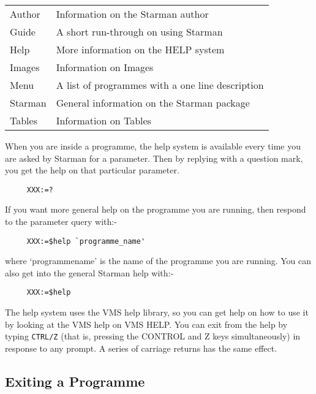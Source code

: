 \begin{tabular}[c]{ll}
\hspace{4ex}  Author  & Information on the Starman author \\
\hspace{4ex}  Guide   & A short run-through on using Starman \\
\hspace{4ex}  Help    & More information on the HELP system \\
\hspace{4ex}  Images  & Information on Images \\
\hspace{4ex}  Menu    & A list of programmes with a one line description \\
\hspace{4ex}  Starman & General information on the Starman package \\
\hspace{4ex}  Tables  & Information on Tables \\
\end{tabular}

When you are inside a programme, the help system is available every time 
you are asked by Starman for a parameter. Then by replying with a
question mark, you get the help on that particular parameter.

\begin{verbatim}
     XXX:=?
\end{verbatim}

If you want more general help on the programme you are running, then
respond to the parameter query with:-

\begin{verbatim}
     XXX:=$help `programme_name'
\end{verbatim}

where `programme{\undersc}name' is the name of the programme you are running.
You can also get into the general Starman help with:-

\begin{verbatim}
     XXX:=$help 
\end{verbatim}


The help system uses the VMS help library, so you can get help on how to
use it by looking at the VMS help on VMS HELP. You can exit from the help
by typing {\tt CTRL/Z} (that is, pressing the CONTROL and Z keys
simultaneously) in response to any prompt. A series of carriage returns has
the same effect. 

\subsection{Exiting a Programme }


